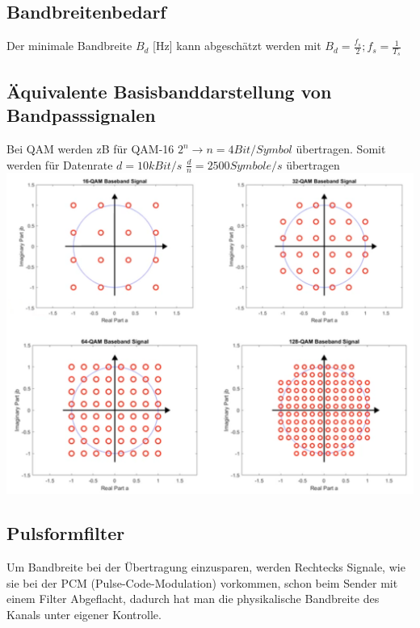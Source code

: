 \subsection{Bandbreitenbedarf}
Der minimale Bandbreite $B_d$ [Hz] kann abgeschätzt werden mit $B_d = \frac{f_s}{2}; f_s = \frac{1}{T_s}$

\subsection{Äquivalente Basisbanddarstellung von Bandpasssignalen} 
Bei QAM werden zB für QAM-16 $2^n \rightarrow n = 4Bit/Symbol$ übertragen. Somit werden für Datenrate $d =10kBit/s$ $\frac{d}{n} = 2500Symbole/s$ übertragen \\
\includegraphics[width=\columnwidth]{Images/qam_basisdarstellung}

\subsection{Pulsformfilter}
Um Bandbreite bei der Übertragung einzusparen, werden Rechtecks Signale, wie sie bei der PCM (Pulse-Code-Modulation) vorkommen, schon beim Sender mit einem Filter Abgeflacht, dadurch hat man die physikalische Bandbreite des Kanals unter eigener Kontrolle.

